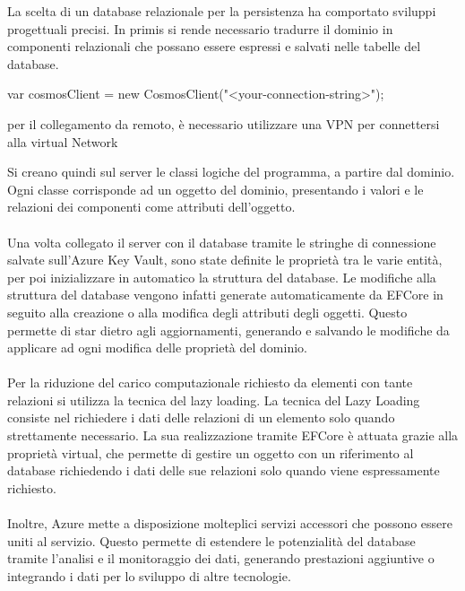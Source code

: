 \clearpage




La scelta di un database relazionale per la persistenza ha comportato sviluppi progettuali precisi.
In primis si rende necessario tradurre il dominio in componenti relazionali che possano essere espressi e salvati nelle tabelle del database.

var cosmosClient = new CosmosClient("<your-connection-string>");

per il collegamento da remoto, è necessario utilizzare una VPN per connettersi alla virtual Network

Si creano quindi sul server le classi logiche del programma, a partire dal dominio.
Ogni classe corrisponde ad un oggetto del dominio, presentando i valori e le relazioni dei componenti come attributi dell’oggetto.\\
\\
Una volta collegato il server con il database tramite le stringhe di connessione salvate sull’Azure Key Vault,
sono state definite le proprietà tra le varie entità, per poi inizializzare in automatico la struttura del database.
Le modifiche alla struttura del database vengono infatti generate automaticamente da EFCore in seguito alla creazione o alla modifica degli attributi degli oggetti.
Questo permette di star dietro agli aggiornamenti, generando e salvando le modifiche da applicare ad ogni modifica delle proprietà del dominio.\\
\\


Per la riduzione del carico computazionale richiesto da elementi con tante relazioni si utilizza la tecnica del lazy loading.
La tecnica del Lazy Loading consiste nel richiedere i dati delle relazioni di un elemento solo quando strettamente necessario.
La sua realizzazione tramite EFCore è attuata grazie alla proprietà virtual,
che permette di gestire un oggetto con un riferimento al database richiedendo i dati delle sue relazioni solo quando viene espressamente richiesto.\\
\\


Inoltre, Azure mette a disposizione molteplici servizi accessori che possono essere uniti al servizio.
Questo permette di estendere le potenzialità del database tramite  l’analisi e il monitoraggio dei dati,
generando prestazioni aggiuntive o integrando i dati per lo sviluppo di altre tecnologie.\\
\\

